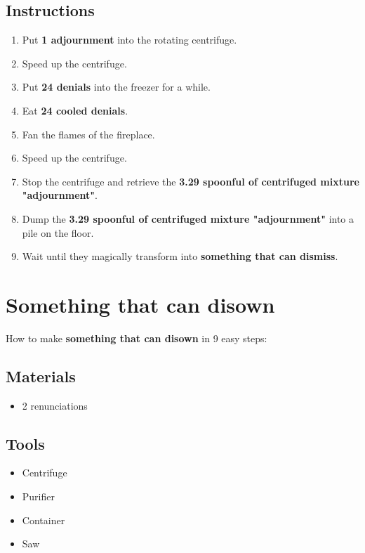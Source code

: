 \documentclass{article}
\begin{document}
\subsection{Instructions}\begin{enumerate}
\item 
Put \textbf{1 adjournment} into the rotating centrifuge.
\item 
Speed up the centrifuge.
\item 
Put \textbf{24 denials} into the freezer for a while.
\item 
Eat \textbf{24 cooled denials}.
\item 
Fan the flames of the fireplace.
\item 
Speed up the centrifuge.
\item 
Stop the centrifuge and retrieve the \textbf{3.29 spoonful of centrifuged mixture "adjournment"}.
\item 
Dump the \textbf{3.29 spoonful of centrifuged mixture "adjournment"} into a pile on the floor.
\item 
Wait until they magically transform into \textbf{something that can dismiss}.
\end{enumerate}
\newpage
\section{Something that can disown}How to make \textbf{something that can disown} in 9 easy steps:

\subsection{Materials}\begin{itemize}
\item 
2 renunciations
\end{itemize}
\subsection{Tools}\begin{itemize}
\item 
Centrifuge
\item 
Purifier
\item 
Container
\item 
Saw
\end{itemize}
\end{document}
